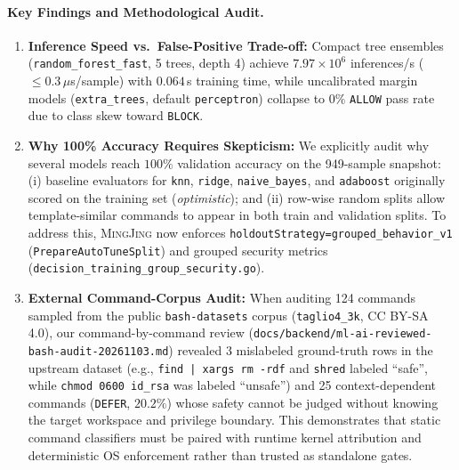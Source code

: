 \documentclass[10pt,twocolumn,letterpaper]{article}
\newcommand{\sys}{\textsc{MingJing}}
\newcommand{\code}[1]{\texttt{\small #1}}
\begin{document}
\paragraph{Key Findings and Methodological Audit.}
\begin{enumerate}
  \item \textbf{Inference Speed vs.\ False-Positive Trade-off:} Compact tree ensembles (\code{random\_forest\_fast}, 5 trees, depth 4) achieve $7.97\times 10^6$ inferences/s ($\le 0.3\,\mu$s/sample) with $0.064\,$s training time, while uncalibrated margin models (\code{extra\_trees}, default \code{perceptron}) collapse to $0\%$ \code{ALLOW} pass rate due to class skew toward \code{BLOCK}.
  \item \textbf{Why 100\% Accuracy Requires Skepticism:} We explicitly audit why several models reach $100\%$ validation accuracy on the 949-sample snapshot: (i) baseline evaluators for \code{knn}, \code{ridge}, \code{naive\_bayes}, and \code{adaboost} originally scored on the training set (\emph{optimistic}); and (ii) row-wise random splits allow template-similar commands to appear in both train and validation splits. To address this, \sys{} now enforces \code{holdoutStrategy=grouped\_behavior\_v1} (\code{PrepareAutoTuneSplit}) and grouped security metrics (\code{decision\_training\_group\_security.go}).
  \item \textbf{External Command-Corpus Audit:} When auditing 124 commands sampled from the public \code{bash-datasets} corpus (\code{taglio4\_3k}, CC BY-SA 4.0), our command-by-command review (\code{docs/backend/ml-ai-reviewed-bash-audit-20261103.md}) revealed 3 mislabeled ground-truth rows in the upstream dataset (e.g., \code{find | xargs rm -rdf} and \code{shred} labeled ``safe'', while \code{chmod 0600 id\_rsa} was labeled ``unsafe'') and 25 context-dependent commands (\code{DEFER}, $20.2\%$) whose safety cannot be judged without knowing the target workspace and privilege boundary. This demonstrates that static command classifiers must be paired with runtime kernel attribution and deterministic OS enforcement rather than trusted as standalone gates.
\end{enumerate}
\end{document}
